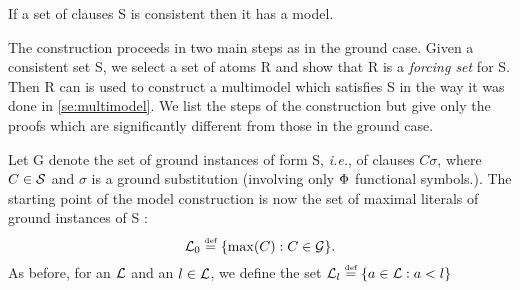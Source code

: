 \begin{THEOREM}\label{completeness}
If a set of clauses \C S is consistent then it has a model.
\end{THEOREM}
\noindent
The construction proceeds in two main steps as in the ground case. 
Given a consistent set \C S,
we select a set of atoms \C R %
and show that \C R is a {\em forcing set}\/ for \C S.
Then \C R can is used to construct a multimodel which satisfies \C S in the
way it was done in \ref{se:multimodel}. We list the steps of the construction
but give only the proofs which are significantly different from those in the
ground case.


Let \C G denote the set of ground instances of form \C S, {\it i.e.}, of
clauses \(C\sigma\), where \(C\in \mbox {$\cal S$}\) and $\sigma$ is a ground
substitution (involving only $\Phi$ functional symbols.).  
The starting point of the model construction is now the set of
maximal literals of ground instances of \C S :
\begin{equation} \label{eq:max-literals}
\mbox {$\cal L$}_0 \mathrel {\stackrel {\mbox {\tiny def}}{=}} \{\max(C) : C\in \mbox {$\cal G$}\}.
\end{equation}
%
As before, for an $\mbox {$\cal L$}$ and an $l\in\mbox {$\cal L$}$, we define the set \(\mbox {$\cal L$}_l\mathrel {\stackrel {\mbox {\tiny def}}{=}} \{a\in\mbox {$\cal L$}:a<l\}\)
%

